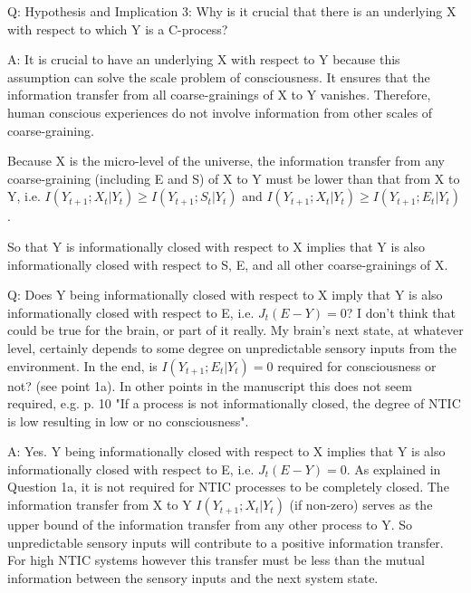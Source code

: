 \documentclass[utf8]{article}
\newcounter{cQuestion}[section]
\newenvironment{question}
    {\refstepcounter{cQuestion}\color{Blue}\noindent\newline Q\thecQuestion:}
    {~\newline}
\newenvironment{ans}  
    {\color{Black}\noindent A:}
    {~\newline}
\begin{document}
       
        
        \begin{question}
            Hypothesis and Implication 3: Why is it crucial that there is an underlying X with respect to which Y is a C-process?     
        \end{question}
        
        \begin{ans}        	
            It is crucial to have an underlying X with respect to Y because this assumption can solve the scale problem of consciousness. It ensures that the information transfer from all coarse-grainings of X to Y vanishes. Therefore, human conscious experiences do not involve information from other scales of coarse-graining. 
            
            Because X is the micro-level of the universe, the information transfer from any coarse-graining (including E and S) of X  to Y must be lower than that from X to Y, i.e. $I(Y_{t+1}; X_t|Y_t) \geq I(Y_{t+1}; S_t|Y_t)$ and $I(Y_{t+1}; X_t|Y_t) \geq I(Y_{t+1}; E_t|Y_t)$.  
            
            So that Y is informationally closed with respect to X implies that Y is also informationally closed with respect to S, E, and all other coarse-grainings of X.             
        \end{ans}
        
        \begin{question}
            Does Y being informationally closed with respect to X imply that Y is also informationally closed with respect to E, i.e. $J_t(E-Y) = 0$? I don't think that could be true for the brain, or part of it really. My brain's next state, at whatever level, certainly depends to some degree on unpredictable sensory inputs from the environment. In the end, is $I(Y_{t+1}; E_t|Y_t) = 0$ required for consciousness or not? (see point 1a). In other points in the manuscript this does not seem required, e.g. p. 10 "If a process is not informationally closed, the degree of NTIC is low resulting in low or no consciousness".    
        \end{question}
        
        \begin{ans}
            Yes. Y being informationally closed with respect to X implies that Y is also informationally closed with respect to E, i.e. $J_t(E-Y) = 0$.
            As explained in Question 1a, it is not required for NTIC processes to be completely closed. The information transfer from X to Y $I(Y_{t+1}; X_t|Y_t)$ (if non-zero) serves as the upper bound of the information transfer from any other process to Y. So unpredictable sensory inputs will contribute to a positive information transfer. For high NTIC systems however this transfer must be less than the mutual information between the sensory inputs and the next system state.        
        \end{ans}
        
\end{document}
